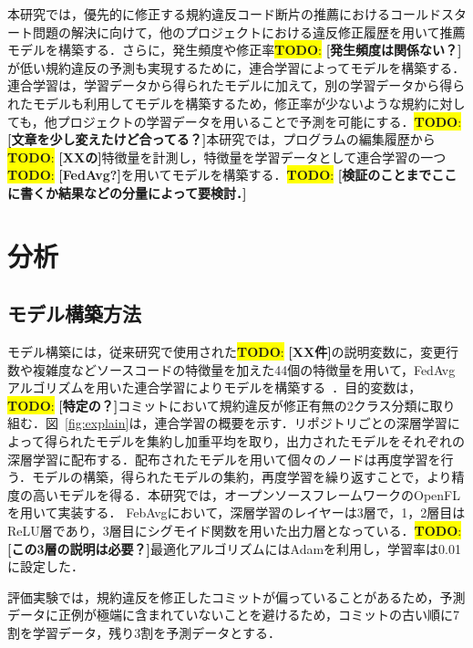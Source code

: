 \documentclass[uplatex,dvipdfmx,a4paper,twocolumn,base=11pt,jbase=11pt,ja=standard]{bxjsarticle}  %
\newcommand{\todo}[1]{\colorbox{yellow}{{\bf TODO}:}{\color{red} {\textbf{[#1]}}}}
\begin{document}
本研究では，優先的に修正する規約違反コード断片の推薦におけるコールドスタート問題の解決に向けて，他のプロジェクトにおける違反修正履歴を用いて推薦モデルを構築する．さらに，発生頻度や修正率\todo{発生頻度は関係ない？}が低い規約違反の予測も実現するために，連合学習によってモデルを構築する．連合学習は，学習データから得られたモデルに加えて，別の学習データから得られたモデルも利用してモデルを構築するため，修正率が少ないような規約に対しても，他プロジェクトの学習データを用いることで予測を可能にする．\todo{文章を少し変えたけど合ってる？}本研究では，プログラムの編集履歴から\todo{XXの}特徴量を計測し，特徴量を学習データとして連合学習の一つ\todo{FedAvg?}を用いてモデルを構築する．\todo{検証のことまでここに書くか結果などの分量によって要検討．}


\section{分析}

\subsection{モデル構築方法}
モデル構築には，従来研究で使用された\todo{XX件}の説明変数に，変更行数や複雑度などソースコードの特徴量を加えた44個の特徴量を用いて，FedAvgアルゴリズムを用いた連合学習によりモデルを構築する~\cite{article2}．目的変数は，\todo{特定の？}コミットにおいて規約違反が修正有無の2クラス分類に取り組む．図~\ref{fig:explain}は，連合学習の概要を示す．リポジトリごとの深層学習によって得られたモデルを集約し加重平均を取り，出力されたモデルをそれぞれの深層学習に配布する．配布されたモデルを用いて個々のノードは再度学習を行う．モデルの構築，得られたモデルの集約，再度学習を繰り返すことで，より精度の高いモデルを得る．本研究では，オープンソースフレームワークのOpenFLを用いて実装する．
FebAvgにおいて，深層学習のレイヤーは3層で，1，2層目はReLU層であり，3層目にシグモイド関数を用いた出力層となっている．\todo{この3層の説明は必要？}最適化アルゴリズムにはAdamを利用し，学習率は0.01に設定した．

評価実験では，規約違反を修正したコミットが偏っていることがあるため，予測データに正例が極端に含まれていないことを避けるため，コミットの古い順に7割を学習データ，残り3割を予測データとする．
\end{document}
